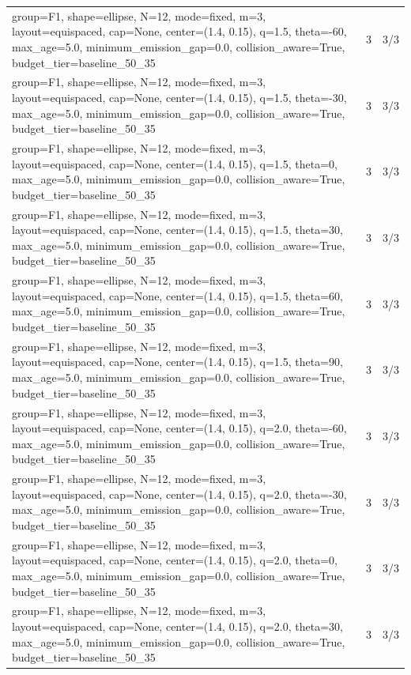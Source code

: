 \begin{tabular}{p{11cm}rr}
group=F1, shape=ellipse, N=12, mode=fixed, m=3, layout=equispaced, cap=None, center=(1.4, 0.15), q=1.5, theta=-60, max\_age=5.0, minimum\_emission\_gap=0.0, collision\_aware=True, budget\_tier=baseline\_50\_35 & 3 & 3/3 \\
group=F1, shape=ellipse, N=12, mode=fixed, m=3, layout=equispaced, cap=None, center=(1.4, 0.15), q=1.5, theta=-30, max\_age=5.0, minimum\_emission\_gap=0.0, collision\_aware=True, budget\_tier=baseline\_50\_35 & 3 & 3/3 \\
group=F1, shape=ellipse, N=12, mode=fixed, m=3, layout=equispaced, cap=None, center=(1.4, 0.15), q=1.5, theta=0, max\_age=5.0, minimum\_emission\_gap=0.0, collision\_aware=True, budget\_tier=baseline\_50\_35 & 3 & 3/3 \\
group=F1, shape=ellipse, N=12, mode=fixed, m=3, layout=equispaced, cap=None, center=(1.4, 0.15), q=1.5, theta=30, max\_age=5.0, minimum\_emission\_gap=0.0, collision\_aware=True, budget\_tier=baseline\_50\_35 & 3 & 3/3 \\
group=F1, shape=ellipse, N=12, mode=fixed, m=3, layout=equispaced, cap=None, center=(1.4, 0.15), q=1.5, theta=60, max\_age=5.0, minimum\_emission\_gap=0.0, collision\_aware=True, budget\_tier=baseline\_50\_35 & 3 & 3/3 \\
group=F1, shape=ellipse, N=12, mode=fixed, m=3, layout=equispaced, cap=None, center=(1.4, 0.15), q=1.5, theta=90, max\_age=5.0, minimum\_emission\_gap=0.0, collision\_aware=True, budget\_tier=baseline\_50\_35 & 3 & 3/3 \\
group=F1, shape=ellipse, N=12, mode=fixed, m=3, layout=equispaced, cap=None, center=(1.4, 0.15), q=2.0, theta=-60, max\_age=5.0, minimum\_emission\_gap=0.0, collision\_aware=True, budget\_tier=baseline\_50\_35 & 3 & 3/3 \\
group=F1, shape=ellipse, N=12, mode=fixed, m=3, layout=equispaced, cap=None, center=(1.4, 0.15), q=2.0, theta=-30, max\_age=5.0, minimum\_emission\_gap=0.0, collision\_aware=True, budget\_tier=baseline\_50\_35 & 3 & 3/3 \\
group=F1, shape=ellipse, N=12, mode=fixed, m=3, layout=equispaced, cap=None, center=(1.4, 0.15), q=2.0, theta=0, max\_age=5.0, minimum\_emission\_gap=0.0, collision\_aware=True, budget\_tier=baseline\_50\_35 & 3 & 3/3 \\
group=F1, shape=ellipse, N=12, mode=fixed, m=3, layout=equispaced, cap=None, center=(1.4, 0.15), q=2.0, theta=30, max\_age=5.0, minimum\_emission\_gap=0.0, collision\_aware=True, budget\_tier=baseline\_50\_35 & 3 & 3/3 \\

\end{tabular}
